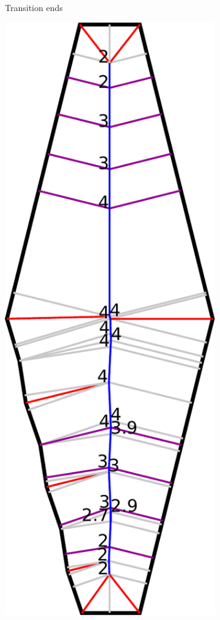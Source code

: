 \begin{figure}
\begin{subfigure}{\figwidth}
\caption{Transition ends}\label{beading_transitioning_filtering__transition_ends}
\end{subfigure}
\begin{subfigure}{\figwidth}
\includegraphics[width=\columnwidth]{sources/method/beading_transitioning_filtering__transitions_applied.pdf}

\end{subfigure}
\end{figure}
